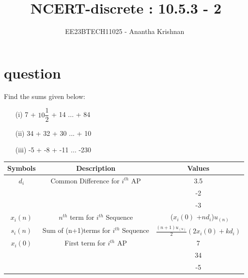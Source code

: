 \documentclass[journal,12pt,onecolumn]{IEEEtran}
\theoremstyle{remark}
\begin{document}

\vspace{3cm}

\title{NCERT-discrete : 10.5.3 - 2}
\author{EE23BTECH11025 - Anantha Krishnan $^{}$%
}
\maketitle
\bigskip



\section{question}
\vspace{0.5cm}
Find the sums given below:
\begin{enumerate}
    \item[(i)] 7 + $10\dfrac{1}{2}$ + 14 ... + 84
    \item[(ii)] 34 + 32 + 30 ... + 10
    \item[(iii)] -5 + -8 + -11 ... -230
\end{enumerate}

 \vspace{0.5cm}
\begin{enumerate}
\begin{tabular}{ |c|c|c| } 
 \hline
Symbols & Description & Values  \\
 \hline
$d_i$ & Common Difference for $i^{th}$ AP & 3.5 \\ \cline{3-3}
 & & -2 \\ \cline{3-3}
 & & -3 \\ 
\hline

  $x_i(n)$ & $n^{th}$ term for $i^{th}$ Sequence & \ ($x_i(0)$ +$nd_i$)$u_{(n)}$\\
  \hline

   $s_i(n)$ & Sum of (n+1)terms for $i^{th}$ Sequence & $\frac{(n+1)u_{(u)}}{2}(2x_i(0) + kd_i)$\\
   \hline

  $x_i(0)$ & First term for $i^{th}$ AP & 7 \\ \cline{3-3}
 & & 34 \\ \cline{3-3}
 & & -5 \\ 
\hline
  
   \hline
\end{tabular}
\end{enumerate}
\centering
\captionsetup{Table 1 : Parameters , Descriptions And Values }
\label{table:ee25-tab1}
\vspace{0.5cm}
\end{document}
